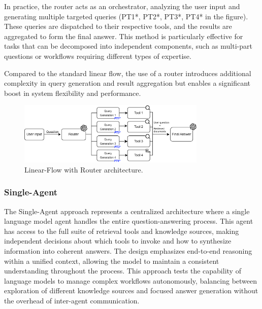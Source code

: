                 In practice, the router acts as an orchestrator, analyzing the user input and generating multiple targeted queries (PT1*, PT2*, PT3*, PT4* in the figure). These queries are dispatched to their respective tools, and the results are aggregated to form the final answer. This method is particularly effective for tasks that can be decomposed into independent components, such as multi-part questions or workflows requiring different types of expertise.
                
                Compared to the standard linear flow, the use of a router introduces additional complexity in query generation and result aggregation but enables a significant boost in system flexibility and performance.

                \begin{figure}[h]
                    \centering
                    \includegraphics[width=0.8\textwidth]{images_exp2/diagrams/diagrama_linear_w_router.png}
                    \caption{Linear-Flow with Router architecture.}
                    \label{fig:diagrama_linear_w_router}
                \end{figure}
                
                

                
            \subsubsection{Single-Agent}

                The Single-Agent approach represents a centralized architecture where a single language model agent handles the entire question-answering process. This agent has access to the full suite of retrieval tools and knowledge sources, making independent decisions about which tools to invoke and how to synthesize information into coherent answers. The design emphasizes end-to-end reasoning within a unified context, allowing the model to maintain a consistent understanding throughout the process. This approach tests the capability of language models to manage complex workflows autonomously, balancing between exploration of different knowledge sources and focused answer generation without the overhead of inter-agent communication.
                
